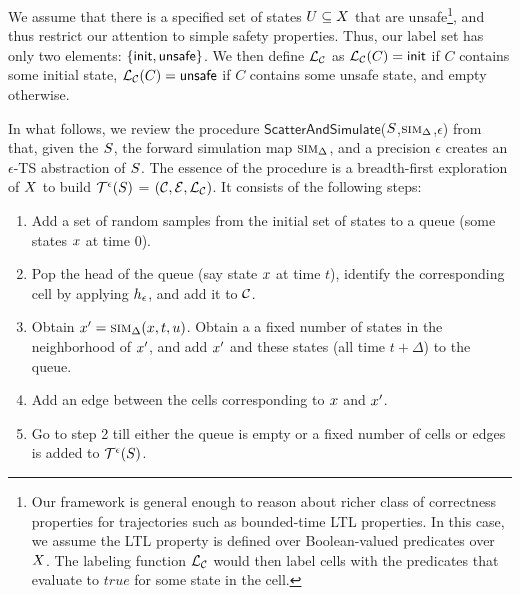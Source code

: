 We assume that there is a specified set of states $U
\subseteq X$ that are unsafe\footnote{Our framework is
general enough to reason about richer class of correctness properties
for trajectories such as bounded-time LTL properties. In this case, we
assume the LTL property is defined over Boolean-valued predicates over
$X$. The labeling function $\mathcal{L}_\mathcal{C}$ would
then label cells with the predicates that evaluate to $\mathit{true}$
for some state in the cell.}, and thus restrict our attention to
simple safety properties. Thus, our label set has only two elements:
$\{\mathsf{init},\mathsf{unsafe}\}$. We then define $\mathcal{L}_\mathcal{C}$ as
$\mathcal{L}_\mathcal{C}(C) = \mathsf{init}$ if $C$ contains some initial state,
$\mathcal{L}_\mathcal{C}(C) = \mathsf{unsafe}$ if $C$ contains some unsafe
state, and empty otherwise.

In what follows, we review the procedure
$\mathsf{ScatterAndSimulate}$($S$,$\mbox{\sc sim}_\Delta$,$\epsilon$)
from \cite{zutshi2014multiple} that, given the $S$, the forward
simulation map $\mbox{\sc sim}_\Delta$, and a precision $\epsilon$ creates an
$\epsilon$-TS abstraction of $S$.  The
essence of the procedure is a breadth-first exploration of
$X$ to build $\mathcal{T}^{\epsilon}(S)$ =
$(\mathcal{C},\mathcal{E},\mathcal{L}_\mathcal{C})$. It consists of the
following steps:
\begin{enumerate}[leftmargin=1em,labelsep=1em,label={\arabic*.}]
\item
Add a set of random samples from the initial set of states to a queue
(\ie some states $x$ at time $0$).
\item
Pop the head of the queue (say state $x$ at time $t$), identify
the corresponding cell by applying $h_\epsilon$, and add it to
$\mathcal{C}$.
\item
Obtain $x' = \mbox{\sc sim}_\Delta(x, t, u)$. Obtain a a
fixed number of states in the neighborhood of $x'$, and add
$x'$ and these states (all time $t+\Delta$) to the queue.
\item
Add an edge between the cells corresponding to $x$ and
$x'$.
\item
Go to step 2 till either the queue is empty or a fixed number of cells
or edges is added to $\mathcal{T}^{\epsilon}(S)$.
\end{enumerate}


